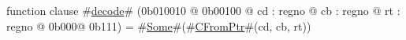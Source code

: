 function clause #\hyperref[zdecode]{decode}# (0b010010 @ 0b00100 @ cd : regno @ cb : regno @ rt : regno @ 0b000@ 0b111) = #\hyperref[zSome]{Some}#(#\hyperref[zCFromPtr]{CFromPtr}#(cd, cb, rt))
